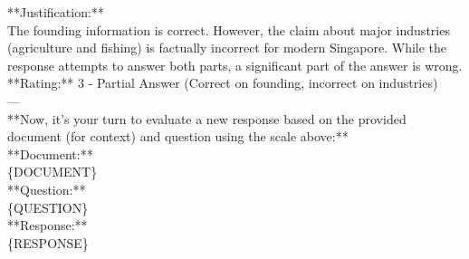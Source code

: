 \begin{tcolorbox}
**Justification:**\\
The founding information is correct. However, the claim about major industries (agriculture and fishing) is factually incorrect for modern Singapore. While the response attempts to answer both parts, a significant part of the answer is wrong.\\
**Rating:** 3 - Partial Answer (Correct on founding, incorrect on industries)\\
---\\
**Now, it's your turn to evaluate a new response based on the provided document (for context) and question using the scale above:**\\
**Document:**\\
\{DOCUMENT\}\\
**Question:**\\
\{QUESTION\}\\
**Response:**\\
\{RESPONSE\}\\


\end{tcolorbox}